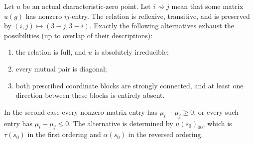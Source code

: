 \begin{lemma}
\label{lem:rh-sp4-graph}
Let \(u\) be an actual characteristic-zero point. Let
\(i\rightsquigarrow j\) mean that some matrix \(u(g)\) has
nonzero \(ij\)-entry. The relation is reflexive, transitive,
and is preserved by \((i,j)\mapsto(3-j,3-i)\).
Exactly the following alternatives exhaust the possibilities
(up to overlap of their descriptions):
\begin{enumerate}
\item the relation is full, and \(u\) is absolutely irreducible;
\item every mutual pair is diagonal;
\item both prescribed coordinate blocks are strongly connected,
and at least one direction between these blocks is entirely absent.
\end{enumerate}
In the second case every nonzero matrix entry has
\(\mu_i-\mu_j\ge0\), or every such entry has
\(\mu_i-\mu_j\le0\). The alternative is determined by
\(u(s_0)_{00}\), which is \(\tau(s_0)\) in the first ordering
and \(\alpha(s_0)\) in the reversed ordering.
\end{lemma}

